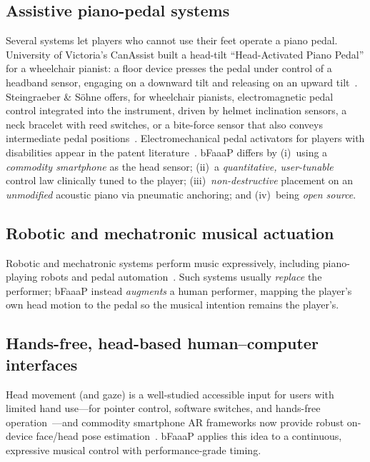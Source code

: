 \subsection{Assistive piano-pedal systems}
Several systems let players who cannot use their feet operate a piano pedal.
University of Victoria's CanAssist built a head-tilt ``Head-Activated Piano
Pedal'' for a wheelchair pianist: a floor device presses the pedal under control
of a headband sensor, engaging on a downward tilt and releasing on an upward
tilt~\cite{canassist}. Steingraeber \& S\"ohne offers, for wheelchair pianists,
electromagnetic pedal control integrated into the instrument, driven by helmet
inclination sensors, a neck bracelet with reed switches, or a bite-force sensor
that also conveys intermediate pedal positions~\cite{steingraeber,mouthpedal2008}.
Electromechanical pedal activators for players with disabilities appear in the
patent literature~\cite{hinsley1988,uspedal2008,uspedal2017}. bFaaaP differs by
(i)~using a \emph{commodity smartphone} as the head sensor; (ii)~a
\emph{quantitative, user-tunable} control law clinically tuned to the player;
(iii)~\emph{non-destructive} placement on an \emph{unmodified} acoustic piano via
pneumatic anchoring; and (iv)~being \emph{open source}.

\subsection{Robotic and mechatronic musical actuation}
Robotic and mechatronic systems perform music expressively, including
piano-playing robots and pedal automation~\cite{weinberg2020,scimeca2020,zappi2012,piano_manipulator2025,ctf_actuator2020}.
Such systems usually \emph{replace} the performer; bFaaaP instead \emph{augments}
a human performer, mapping the player's own head motion to the pedal so the
musical intention remains the player's.

\subsection{Hands-free, head-based human--computer interfaces}
Head movement (and gaze) is a well-studied accessible input for users with limited
hand use---for pointer control, software switches, and hands-free
operation~\cite{sumak2019,varona2008,manresa2014}---and commodity smartphone AR
frameworks now provide robust on-device face/head pose
estimation~\cite{arkit}. bFaaaP applies this idea to a continuous, expressive
musical control with performance-grade timing.

